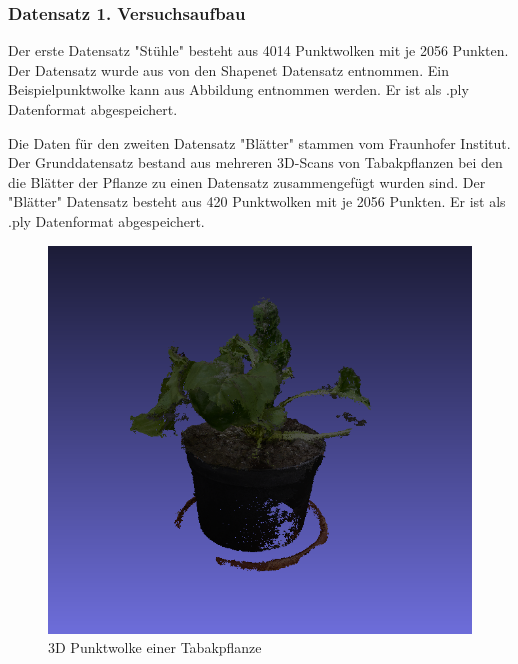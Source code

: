 \documentclass{llncs}
\begin{document}
\subsubsection{Datensatz 1. Versuchsaufbau}
Der erste Datensatz "Stühle" besteht aus 4014 Punktwolken mit je 2056 Punkten. Der Datensatz wurde aus von den Shapenet Datensatz entnommen. Ein Beispielpunktwolke kann aus Abbildung entnommen werden. Er ist als .ply Datenformat abgespeichert. 

 Die Daten für den zweiten Datensatz "Blätter" stammen vom Fraunhofer Institut. Der Grunddatensatz bestand aus mehreren 3D-Scans von Tabakpflanzen bei den die Blätter der Pflanze zu einen Datensatz zusammengefügt wurden sind. Der "Blätter" Datensatz besteht aus 420 Punktwolken mit je 2056 Punkten. Er ist als .ply Datenformat abgespeichert.
\begin{figure}[htbp] 
	\centering
	\includegraphics[width=1.2\textwidth]{plant.png}
	\caption{3D Punktwolke einer Tabakpflanze}
	\label{fig:Bild2}
\end{figure}
\end{document}

